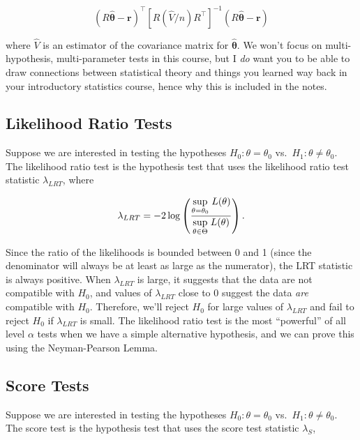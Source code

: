 \documentclass[
  letterpaper,
  DIV=11,
  numbers=noendperiod]{scrreprt}
\begin{document}
\[
(R\hat{\boldsymbol{\theta}} - \textbf{r})^\top [R (\hat{V}/n) R^\top]^{-1} (R\hat{\boldsymbol{\theta}} - \textbf{r})
\]

where \(\hat{V}\) is an estimator of the covariance matrix for
\(\hat{\boldsymbol{\theta}}\). We won't focus on multi-hypothesis,
multi-parameter tests in this course, but I \emph{do} want you to be
able to draw connections between statistical theory and things you
learned way back in your introductory statistics course, hence why this
is included in the notes.

\hypertarget{likelihood-ratio-tests}{%
\subsection*{Likelihood Ratio Tests}\label{likelihood-ratio-tests}}

Suppose we are interested in testing the hypotheses
\(H_0: \theta = \theta_0\) vs.~\(H_1: \theta \neq \theta_0\). The
likelihood ratio test is the hypothesis test that uses the likelihood
ratio test statistic \(\lambda_{LRT}\), where

\[
\lambda_{LRT} = -2 \log\left(\frac{\underset{\theta = \theta_0}{\text{sup}} \hspace{1mm} L(\theta)}{\underset{\theta \in \Theta}{\text{sup}} \hspace{1mm} L(\theta)} \right).
\]

Since the ratio of the likelihoods is bounded between 0 and 1 (since the
denominator will always be at least as large as the numerator), the LRT
statistic is always positive. When \(\lambda_{LRT}\) is large, it
suggests that the data are not compatible with \(H_0\), and values of
\(\lambda_{LRT}\) close to \(0\) suggest the data \emph{are} compatible
with \(H_0\). Therefore, we'll reject \(H_0\) for large values of
\(\lambda_{LRT}\) and fail to reject \(H_0\) if \(\lambda_{LRT}\) is
small. The likelihood ratio test is the most ``powerful'' of all level
\(\alpha\) tests when we have a simple alternative hypothesis, and we
can prove this using the Neyman-Pearson Lemma.

\hypertarget{score-tests}{%
\subsection*{Score Tests}\label{score-tests}}

Suppose we are interested in testing the hypotheses
\(H_0: \theta = \theta_0\) vs.~\(H_1: \theta \neq \theta_0\). The score
test is the hypothesis test that uses the score test statistic
\(\lambda_S\),
\end{document}
